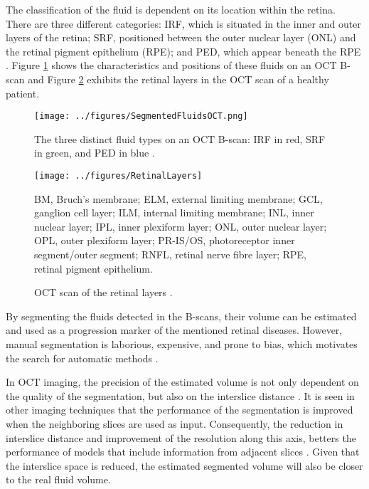 \par
The classification of the fluid is dependent on its location within the retina. There are three different categories: IRF, which is situated in the inner and outer layers of the retina; SRF, positioned between the outer nuclear layer (ONL) and the retinal pigment epithelium (RPE); and PED, which appear beneath the RPE \parencite{Bogunovic2019a}. Figure \ref{fig:SegmentedFluidsOCT} shows the characteristics and positions of these fluids on an OCT B-scan and Figure \ref{fig:RetinalLayers} exhibits the retinal layers in the OCT scan of a healthy patient.
\par
\begin{figure}[!ht]
	\centering
	\texttt{[image: ../figures/SegmentedFluidsOCT.png]}
	\caption{The three distinct fluid types on an OCT B-scan: IRF in red, SRF in green, and PED in blue \cite{Bogunovic2019a}.}
	\label{fig:SegmentedFluidsOCT}
\end{figure}
\begin{figure}[!ht]
	\centering
	\texttt{[image: ../figures/RetinalLayers]}
	\caption{OCT scan of the retinal layers \cite{Almonte2020}.}
	\label{fig:RetinalLayers}
	\footnotesize
	\justifying
	BM, Bruch's membrane; ELM, external limiting membrane; GCL, ganglion cell layer; ILM, internal limiting membrane; INL, inner nuclear layer; IPL, inner plexiform layer; ONL, outer nuclear layer; OPL, outer plexiform layer; PR-IS/OS, photoreceptor inner segment/outer segment; RNFL, retinal nerve fibre layer; RPE, retinal pigment epithelium.
\end{figure}
\par
By segmenting the fluids detected in the B-scans, their volume can be estimated and used as a progression marker of the mentioned retinal diseases. However, manual segmentation is laborious, expensive, and prone to bias, which motivates the search for automatic methods \cite{Viedma2022}. 
\par
In OCT imaging, the precision of the estimated volume is not only dependent on the quality of the segmentation, but also on the interslice distance \cite{Lopez2023}. It is seen in other imaging techniques that the performance of the segmentation is improved when the neighboring slices are used as input. Consequently, the reduction in interslice distance and improvement of the resolution along this axis, betters the performance of models that include information from adjacent slices \cite{Selvi2013}. Given that the interslice space is reduced, the estimated segmented volume will also be closer to the real fluid volume.
